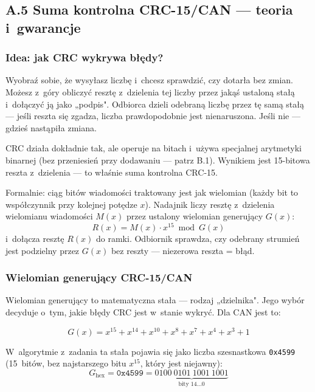 \documentclass[12pt,a4paper]{article}
\begin{document}
\subsection*{A.5 Suma kontrolna CRC-15/CAN — teoria i~gwarancje}

\subsubsection*{Idea: jak CRC wykrywa błędy?}

Wyobraź sobie, że wysyłasz liczbę i~chcesz sprawdzić, czy dotarła bez zmian.
Możesz z~góry obliczyć resztę z~dzielenia tej liczby przez jakąś ustaloną
stałą i~dołączyć ją jako „podpis". Odbiorca dzieli odebraną liczbę przez tę
samą stałą — jeśli reszta się zgadza, liczba prawdopodobnie jest nienaruszona.
Jeśli nie — gdzieś nastąpiła zmiana.

CRC działa dokładnie tak, ale operuje na bitach i~używa specjalnej arytmetyki
binarnej (bez przeniesień przy dodawaniu — patrz B.1). Wynikiem jest
15-bitowa reszta z~dzielenia — to właśnie suma kontrolna CRC-15.

Formalnie: ciąg bitów wiadomości traktowany jest jak wielomian (każdy bit to
współczynnik przy kolejnej potędze $x$). Nadajnik liczy resztę z~dzielenia
wielomianu wiadomości $M(x)$ przez ustalony wielomian generujący $G(x)$:
\[
R(x) = M(x) \cdot x^{15} \bmod G(x)
\]
i~dołącza resztę $R(x)$ do ramki. Odbiornik sprawdza, czy odebrany strumień
jest podzielny przez $G(x)$ bez reszty — niezerowa reszta = błąd.

\subsubsection*{Wielomian generujący CRC-15/CAN}

Wielomian generujący to matematyczna stała — rodzaj „dzielnika". Jego wybór
decyduje o~tym, jakie błędy CRC jest w~stanie wykryć. Dla CAN jest to:

\begin{equation}
G(x) = x^{15} + x^{14} + x^{10} + x^8 + x^7 + x^4 + x^3 + 1
\end{equation}

W~algorytmie z~zadania ta stała pojawia się jako liczba szesnastkowa \texttt{0x4599}
(15~bitów, bez najstarszego bitu $x^{15}$, który jest niejawny):
\[
G_{\text{hex}} = \texttt{0x4599}
= \underbrace{0100\ 0101\ 1001\ 1001}_{\text{bity 14\ldots0}}
\]
\end{document}

